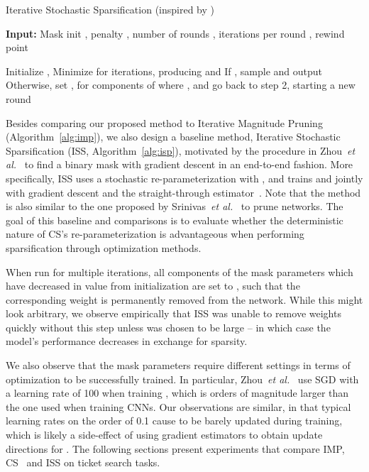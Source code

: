 \documentclass{article}
\newcommand{\citep}[1]{\cite{#1}}
\newcommand{\citet}[1]{\cite{#1}}
\newcommand{\etal}{\textit{et al.}}
\newcommand{\methodacro}{CS}
\begin{document}
\begin{algorithm}
    \caption{Iterative Stochastic Sparsification (inspired by \citet{deconstructing})}
    \textbf{Input:} Mask init , penalty , number of rounds , iterations per round , rewind point 
    \label{alg:isp}
    \begin{algorithmic}[1]
    \State Initialize , 
    \State Minimize  for  iterations, producing  and 
    \State If , sample  and output 
    \State Otherwise, set ,  for components of  where ,  and go back to step 2, starting a new round
    \end{algorithmic}
\end{algorithm}

Besides comparing our proposed method to Iterative Magnitude Pruning (Algorithm~\ref{alg:imp}), we also design a baseline method, Iterative Stochastic Sparsification (ISS, Algorithm~\ref{alg:isp}), motivated by the procedure in Zhou~\etal~\citet{deconstructing} to find a binary mask  with gradient descent in an end-to-end fashion. More specifically, ISS uses a stochastic re-parameterization  with , and trains  and  jointly with gradient descent and the straight-through estimator~\citep{straightthrough}. Note that the method is also similar to the one proposed by Srinivas~\etal~\cite{l0bernoulli} to prune networks. The goal of this baseline and comparisons is to evaluate whether the deterministic nature of \methodacro's re-parameterization is advantageous when performing sparsification through optimization methods.

When run for multiple iterations, all components of the mask parameters  which have decreased in value from initialization are set to , such that the corresponding weight is permanently removed from the network. While this might look arbitrary, we observe empirically that ISS was unable to remove weights quickly without this step unless  was chosen to be large -- in which case the model's performance decreases in exchange for sparsity.

We also observe that the mask parameters  require different settings in terms of optimization to be successfully trained. In particular, Zhou~\etal~\cite{deconstructing} use SGD with a learning rate of 100 when training , which is orders of magnitude larger than the one used when training CNNs. Our observations are similar, in that typical learning rates on the order of 0.1 cause  to be barely updated during training, which is likely a side-effect of using gradient estimators to obtain update directions for . The following sections present experiments that compare IMP, \methodacro~ and ISS on ticket search tasks.
\end{document}
